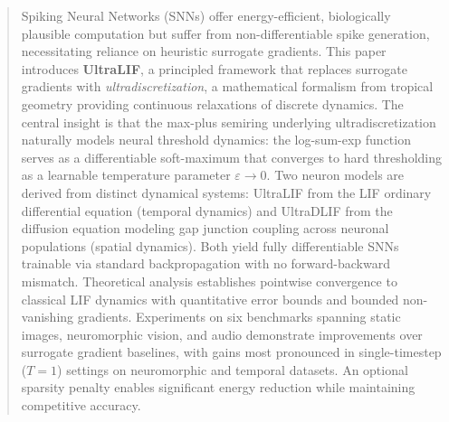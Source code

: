 \documentclass{article}
\theoremstyle{plain}
\theoremstyle{definition}
\theoremstyle{remark}
\newcommand{\eps}{\varepsilon}
\begin{document}

\printAffiliationsAndNotice{}

\begin{abstract}
Spiking Neural Networks (SNNs) offer energy-efficient, biologically plausible computation but suffer from non-differentiable spike generation, necessitating reliance on heuristic surrogate gradients. This paper introduces \textbf{UltraLIF}, a principled framework that replaces surrogate gradients with \emph{ultradiscretization}, a mathematical formalism from tropical geometry providing continuous relaxations of discrete dynamics. The central insight is that the max-plus semiring underlying ultradiscretization naturally models neural threshold dynamics: the log-sum-exp function serves as a differentiable soft-maximum that converges to hard thresholding as a learnable temperature parameter $\eps \to 0$. Two neuron models are derived from distinct dynamical systems: UltraLIF from the LIF ordinary differential equation (temporal dynamics) and UltraDLIF from the diffusion equation modeling gap junction coupling across neuronal populations (spatial dynamics). Both yield fully differentiable SNNs trainable via standard backpropagation with no forward-backward mismatch. Theoretical analysis establishes pointwise convergence to classical LIF dynamics with quantitative error bounds and bounded non-vanishing gradients. Experiments on six benchmarks spanning static images, neuromorphic vision, and audio demonstrate improvements over surrogate gradient baselines, with gains most pronounced in single-timestep ($T{=}1$) settings on neuromorphic and temporal datasets. An optional sparsity penalty enables significant energy reduction while maintaining competitive accuracy.
\end{abstract}
\end{document}
